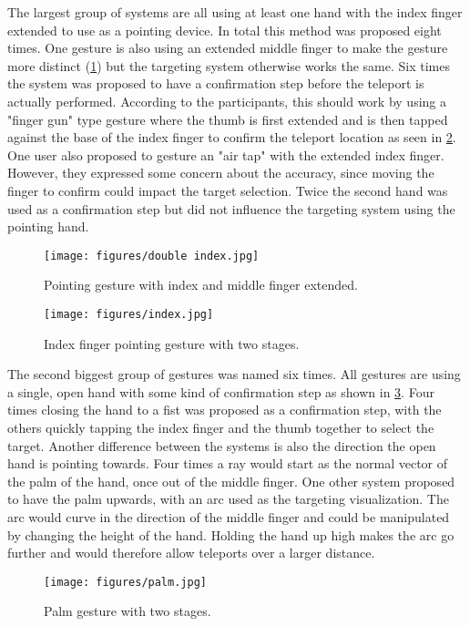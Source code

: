 The largest group of systems are all using at least one hand with the index finger extended to use as a pointing device. In total this method was proposed eight times. One gesture is also using an extended middle finger to make the gesture more distinct (\ref{fig:index2}) but the targeting system otherwise works the same. Six times the system was proposed to have a confirmation step before the teleport is actually performed. According to the participants, this should work by using a "finger gun" type gesture where the thumb is first extended and is then tapped against the base of the index finger to confirm the teleport location as seen in \ref{fig:index}. One user also proposed to gesture an "air tap" with the extended index finger. However, they expressed some concern about the accuracy, since moving the finger to confirm could impact the target selection. Twice the second hand was used as a confirmation step but did not influence the targeting system using the pointing hand.

\begin{figure}[!ht]
    \centering
    \texttt{[image: figures/double index.jpg]}
    \caption{Pointing gesture with index and middle finger extended.}
    \label{fig:index2}
\end{figure}

\begin{figure}[!ht]
    \centering
    \texttt{[image: figures/index.jpg]}
    \caption{Index finger pointing gesture with two stages.}
    \label{fig:index}
\end{figure}


The second biggest group of gestures was named six times. All gestures are using a single, open hand with some kind of confirmation step as shown in \ref{fig:palm2}. Four times closing the hand to a fist was proposed as a confirmation step, with the others quickly tapping the index finger and the thumb together to select the target. Another difference between the systems is also the direction the open hand is pointing towards. Four times a ray would start as the normal vector of the palm of the hand, once out of the middle finger. One other system proposed to have the palm upwards, with an arc used as the targeting visualization. The arc would curve in the direction of the middle finger and could be manipulated by changing the height of the hand. Holding the hand up high makes the arc go further and would therefore allow teleports over a larger distance.

\begin{figure}[!ht]
    \centering
    \texttt{[image: figures/palm.jpg]}
    \caption{Palm gesture with two stages.}
    \label{fig:palm2}
\end{figure}

